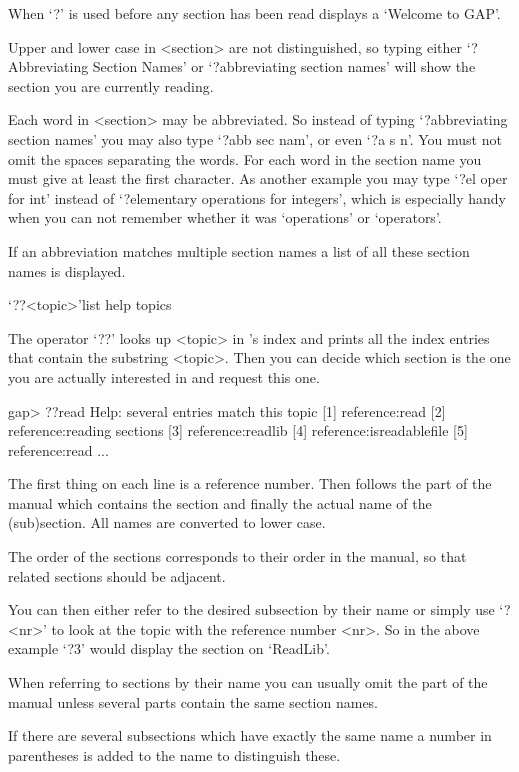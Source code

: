 When `?' is used before any section has been read {\GAP} displays a
`Welcome to GAP'.


Upper and lower case in <section> are not distinguished, so typing either
`?Abbreviating Section Names' or `?abbreviating section names' will show
the section you are currently reading.

Each word in <section> may be abbreviated. So instead of typing
`?abbreviating section names' you may also type `?abb sec nam', or even `?a
s n'. You must not omit the spaces separating the words. For each word in
the section name you must give at least the first character. As another
example you may type `?el oper for int' instead of `?elementary operations
for integers', which is especially handy when you can not remember whether
it was `operations' or `operators'.

If an abbreviation matches multiple section names a list of all these
section names is displayed.


\>`??<topic>'{list help topics}

The operator `??' looks up <topic> in {\GAP}'s index and prints all the
index entries that contain the substring <topic>.
Then you can decide which section is the one you are actually interested
in and request this one.

\begintt
gap> ??read
Help: several entries match this topic
[1] reference:read
[2] reference:reading sections
[3] reference:readlib
[4] reference:isreadablefile
[5] reference:read
...
\endtt

The first thing on each line is a reference number.
Then follows the part of the manual which contains the section and
finally the actual name of the (sub)section. All names are converted to
lower case.

The order of the sections corresponds to their order in the
{\GAP} manual, so that related sections should be adjacent.

You can then either refer to the desired subsection by their name or simply
use `?<nr>' to look at the topic with the reference number <nr>. So in the
above example `?3' would display the section on `ReadLib'.

When referring to sections by their name you can usually omit the part
of the manual unless several parts contain the same section names.

If there are several subsections which have exactly the same name a number
in parentheses is added to the name to distinguish these.



